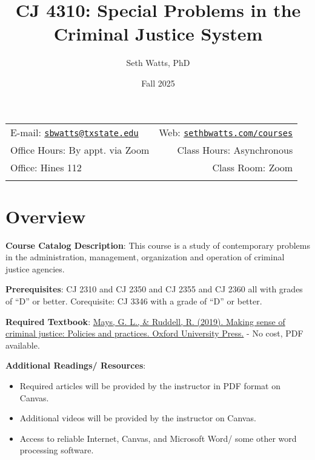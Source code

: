 \documentclass[11pt,]{article}
\title{CJ 4310: Special Problems in the Criminal Justice System}
\author{Seth Watts, PhD}
\date{Fall 2025}
\begin{document}
		\maketitle
	

		\thispagestyle{firststyle}



	\noindent \begin{tabular*}{\textwidth}{ @{\extracolsep{\fill}} lr @{\extracolsep{\fill}}}


E-mail: \texttt{\href{mailto:sbwatts@txstate.edu}{\nolinkurl{sbwatts@txstate.edu}}} & Web: \href{http://sethbwatts.com/courses}{\tt sethbwatts.com/courses}\\
Office Hours: By appt. via Zoom  &  Class Hours: Asynchronous\\
Office: Hines 112  & Class Room: Zoom\\
	&  \\

	\hline
	\end{tabular*}

\vspace{2mm}



\section{Overview}\label{overview}

\textbf{Course Catalog Description}: This course is a study of
contemporary problems in the administration, management, organization
and operation of criminal justice agencies.

\textbf{Prerequisites}: CJ 2310 and CJ 2350 and CJ 2355 and CJ 2360 all
with grades of ``D'' or better. Corequisite: CJ 3346 with a grade of
``D'' or better.

\textbf{Required Textbook}:
\href{https://www.homeworkforyou.com/static_media/uploadedfiles/1714949674_779199__116..pdf}{Mays,
G. L., \& Ruddell, R. (2019). Making sense of criminal justice: Policies
and practices. Oxford University Press.} - No cost, PDF available.

\textbf{Additional Readings/ Resources}:

\begin{itemize}
\item
  Required articles will be provided by the instructor in PDF format on
  Canvas.
\item
  Additional videos will be provided by the instructor on Canvas.
\item
  Access to reliable Internet, Canvas, and Microsoft Word/ some other
  word processing software.
\end{itemize}
\end{document}

